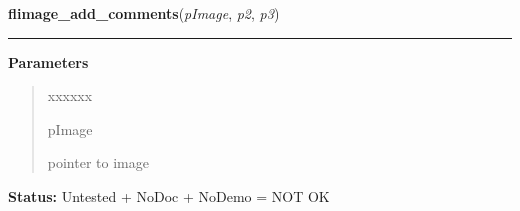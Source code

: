     \label{xformslib:library:flimage_add_comments}

    \vspace{0.5ex}

\hspace{.8\funcindent}\begin{boxedminipage}{\funcwidth}

    \raggedright \textbf{flimage\_add\_comments}(\textit{pImage}, \textit{p2}, \textit{p3})

    \vspace{-1.5ex}

    \rule{\textwidth}{0.5\fboxrule}
\setlength{\parskip}{2ex}
\setlength{\parskip}{1ex}
      \textbf{Parameters}
      \vspace{-1ex}

      \begin{quote}
        \begin{Ventry}{xxxxxx}

          \item[pImage]

          pointer to image

        \end{Ventry}

      \end{quote}

\textbf{Status:} Untested + NoDoc + NoDemo = NOT OK



    \end{boxedminipage}

    \label{xformslib:library:flimage_color_to_pixel}

    \vspace{0.5ex}

